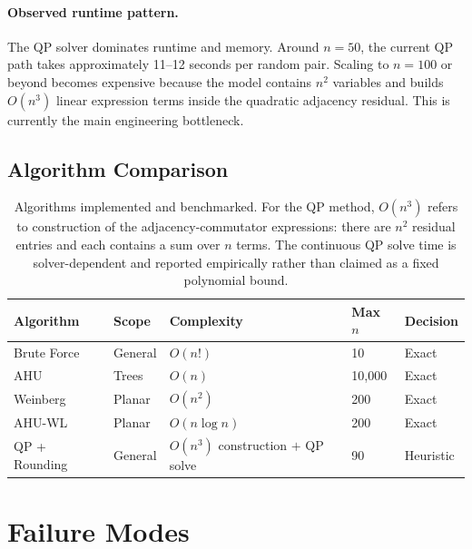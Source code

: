 \documentclass[12pt,a4paper]{article}
\begin{document}
\paragraph{Observed runtime pattern.}
The QP solver dominates runtime and memory.  Around $n = 50$, the current QP
path takes approximately 11--12 seconds per random pair.  Scaling to $n = 100$
or beyond becomes expensive because the model contains $n^2$ variables and
builds $O(n^3)$ linear expression terms inside the quadratic adjacency residual.
This is currently the main engineering bottleneck.

\subsection{Algorithm Comparison}

\begin{table}[H]
\centering
\begin{tabular}{@{}lllll@{}}
\toprule
\textbf{Algorithm} & \textbf{Scope} & \textbf{Complexity} &
\textbf{Max $n$} & \textbf{Decision} \\
\midrule
Brute Force       & General & $O(n!)$            & 10     & Exact \\
AHU               & Trees   & $O(n)$             & 10,000 & Exact \\
Weinberg          & Planar  & $O(n^2)$           & 200    & Exact \\
AHU-WL            & Planar  & $O(n \log n)$      & 200    & Exact \\
QP + Rounding     & General & $O(n^3)$ construction $+$ QP solve & 90 & Heuristic \\
\bottomrule
\end{tabular}
\caption{Algorithms implemented and benchmarked.  For the QP method,
$O(n^3)$ refers to construction of the adjacency-commutator expressions:
there are $n^2$ residual entries and each contains a sum over $n$ terms.
The continuous QP solve time is solver-dependent and reported empirically
rather than claimed as a fixed polynomial bound.}
\label{tab:comparison}
\end{table}

\section{Failure Modes}\label{sec:failures}
\end{document}
